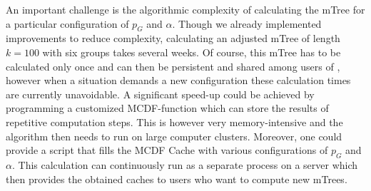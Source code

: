 %
An important challenge is the algorithmic complexity of calculating the mTree for a particular configuration of $p_G$ and $\alpha$.
%
Though we already implemented improvements to reduce complexity, calculating an adjusted mTree of length $k=100$ with six groups takes several weeks.
%
Of course, this mTree has to be calculated only once and can then be persistent and shared among users of \algoFAIR, however when a situation demands a new configuration these calculation times are currently unavoidable.
%
A significant speed-up could be achieved by programming a customized MCDF-function which can store the results of repetitive computation steps.
%
This is however very memory-intensive and the algorithm then needs to run on large computer clusters.
%
Moreover, one could provide a script that fills the MCDF Cache with various configurations of $p_G$ and $\alpha$.
%
%
This calculation can continuously run as a separate process on a server which then provides the obtained caches to users who want to compute new mTrees.

